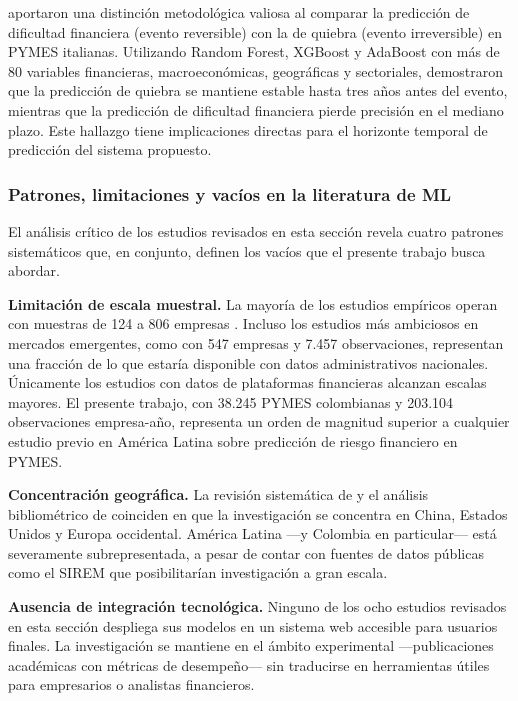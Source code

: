 \documentclass[12pt, letterpaper]{article}
\begin{document}
\citet{Bortolotti2024} aportaron una distinci\'on metodol\'ogica valiosa al comparar la predicci\'on de dificultad financiera (evento reversible) con la de quiebra (evento irreversible) en PYMES italianas. Utilizando Random Forest, XGBoost y AdaBoost con m\'as de 80 variables financieras, macroecon\'omicas, geogr\'aficas y sectoriales, demostraron que la predicci\'on de quiebra se mantiene estable hasta tres a\~nos antes del evento, mientras que la predicci\'on de dificultad financiera pierde precisi\'on en el mediano plazo. Este hallazgo tiene implicaciones directas para el horizonte temporal de predicci\'on del sistema propuesto.

\subsubsection{Patrones, limitaciones y vac\'ios en la literatura de ML}

El an\'alisis cr\'itico de los estudios revisados en esta secci\'on revela cuatro patrones sistem\'aticos que, en conjunto, definen los vac\'ios que el presente trabajo busca abordar.

\textbf{Limitaci\'on de escala muestral.} La mayor\'ia de los estudios emp\'iricos operan con muestras de 124 a 806 empresas \citep{Boumhidi2025, PtakChmielewska2020, Bortolotti2024}. Incluso los estudios m\'as ambiciosos en mercados emergentes, como \citet{Mahesh2025} con 547 empresas y 7.457 observaciones, representan una fracci\'on de lo que estar\'ia disponible con datos administrativos nacionales. \'Unicamente los estudios con datos de plataformas financieras \citep{Yufenyuy2024} alcanzan escalas mayores. El presente trabajo, con 38.245 PYMES colombianas y 203.104 observaciones empresa-a\~no, representa un orden de magnitud superior a cualquier estudio previo en Am\'erica Latina sobre predicci\'on de riesgo financiero en PYMES.

\textbf{Concentraci\'on geogr\'afica.} La revisi\'on sistem\'atica de \citet{Paz2025} y el an\'alisis bibliom\'etrico de \citet{Abubakar2025} coinciden en que la investigaci\'on se concentra en China, Estados Unidos y Europa occidental. Am\'erica Latina ---y Colombia en particular--- est\'a severamente subrepresentada, a pesar de contar con fuentes de datos p\'ublicas como el SIREM que posibilitar\'ian investigaci\'on a gran escala.

\textbf{Ausencia de integraci\'on tecnol\'ogica.} Ninguno de los ocho estudios revisados en esta secci\'on despliega sus modelos en un sistema web accesible para usuarios finales. La investigaci\'on se mantiene en el \'ambito experimental ---publicaciones acad\'emicas con m\'etricas de desempe\~no--- sin traducirse en herramientas \'utiles para empresarios o analistas financieros.
\end{document}
